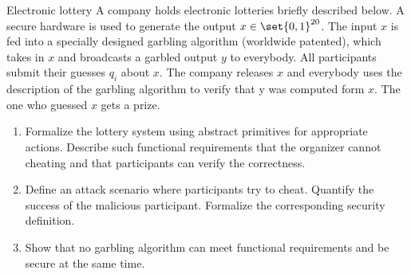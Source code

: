 \documentclass{crypto-exercise}
\author{Sven Laur}
\begin{document}
\begin{exercise}{Electronic lottery}
  A company holds electronic lotteries briefly described below. A
  secure hardware is used to generate the output $x\in \set{0,
    1}^{20}$.  The input $x$ is fed into a specially designed garbling
  algorithm (worldwide patented), which takes in $x$ and broadcasts a
  garbled output $y$ to everybody. All participants submit their
  guesses $q_i$ about $x$. The company releases $x$ and everybody uses
  the description of the garbling algorithm to verify that y was
  computed form $x$. The one who guessed $x$ gets a prize.
  \begin{enumerate}
  \item Formalize the lottery system using abstract primitives for
    appropriate actions. Describe such functional requirements that
    the organizer cannot cheating and that participants can verify the
    correctness.
  \item Define an attack scenario where participants try to
    cheat. Quantify the success of the malicious
    participant. Formalize the corresponding security definition.
  \item Show that no garbling algorithm can meet functional
    requirements and be secure at the same time.
  \end{enumerate}
\end{exercise}
\end{document}
